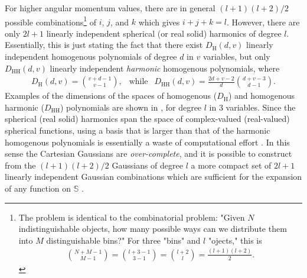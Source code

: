 \documentclass[../../master.tex]{subfiles}
\begin{document}
For higher angular momentum values, there are in general $(l+1)(l+2)/2$ possible combinations\footnote{The problem is identical to the combinatorial problem: "Given $N$ indistinguishable objects, how many possible ways can we distribute them into $M$ distinguishable bins?" For three "bins" and $l$ "ojects," this is \begin{align}
{N+M-1\choose M-1}={l+3-1\choose3-1}={l+2\choose l}=\frac{(l+1)(l+2)}{2}.
\end{align} } of $i$, $j$, and $k$ which gives $i+j+k=l$. However, there are only $2l+1$ linearly independent spherical (or real solid) harmonics of degree $l$. Essentially, this is just stating the fact that there exist $D_\text{H}(d,v)$ linearly independent homogenous polynomials of degree $d$ in $v$ variables, but only $D_\text{HH}(d,v)$ linearly independent \emph{harmonic} homogenous polynomials, where \cite{hochstadt}
\begin{align}
D_\text{H}(d,v) = {v+d-1 \choose v-1}, \ \ \text{ while } \ \  D_\text{HH}(d,v) = \frac{2d+v-2}{d}{d+v-3 \choose d-1}.
\end{align}
Examples of the dimensions of the spaces of homogenous ($D_\text{H}$) and homogenous harmonic ($D_\text{HH}$) polynomials are shown in , for degree $l$ in $3$ variables. Since the spherical (real solid) harmonics span the space of complex-valued (real-valued) spherical functions, using a basis that is larger than that of the harmonic homogenous polynomials is essentially a waste of computational effort \cite{atkinson}. In this sense the Cartesian Gaussians are \emph{over-complete}, and it is possible to construct from the $(l+1)(l+2)/2$ Gaussians of degree $l$ a more compact set of $2l+1$ linearly independent Gaussian combinations which are sufficient for the expansion of any function on $\mathbb{S}$ \cite{helgaker}. 
\end{document}

